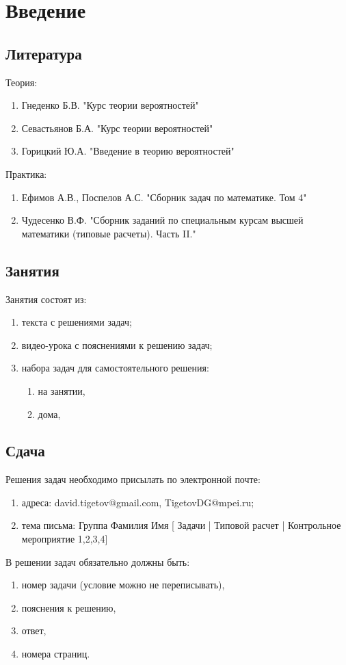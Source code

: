 \chapter{Введение}


\section*{Литература}

Теория:
\begin{enumerate}
    \item Гнеденко Б.В. "Курс теории вероятностей"
    \item Севастьянов Б.А. "Курс теории вероятностей"
    \item Горицкий Ю.А. "Введение в теорию вероятностей"
\end{enumerate}

Практика:
\begin{enumerate}
    \item Ефимов А.В., Поспелов А.С. "Сборник задач по математике. Том 4"
    \item Чудесенко В.Ф. "Сборник заданий по специальным курсам высшей математики (типовые расчеты). Часть II."
\end{enumerate}


\section*{Занятия}

Занятия состоят из:
\begin{enumerate}
    \item текста с решениями задач;
    \item видео-урока с пояснениями к решению задач;
    \item набора задач для самостоятельного решения:
    \begin{enumerate}
        \item на занятии,
        \item дома,
    \end{enumerate}
\end{enumerate}


\section*{Сдача}

Решения задач необходимо присылать по электронной почте:
\begin{enumerate}
    \item адреса: david.tigetov@gmail.com, TigetovDG@mpei.ru;
    \item тема письма: Группа Фамилия Имя [ Задачи | Типовой расчет | Контрольное мероприятие {1,2,3,4}]
\end{enumerate}

В решении задач обязательно должны быть:
\begin{enumerate}
    \item номер задачи (условие можно не переписывать),
    \item пояснения к решению,
    \item ответ,
    \item номера страниц.
\end{enumerate}